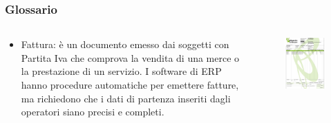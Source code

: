 \documentclass[]{beamer}
\begin{document}
\begin{frame}
\frametitle{Glossario}
\begin{columns}
  \begin{column}{.55\textwidth}
    \begin{itemize}
      \item \alert{Fattura:} è un documento emesso dai soggetti con Partita Iva che comprova la vendita di una merce o la prestazione di un servizio. I software di ERP hanno procedure automatiche per emettere fatture, ma richiedono che i dati di partenza inseriti dagli operatori siano precisi e completi.
    \end{itemize}
  \end{column}
  \begin{column}{.5\textwidth}
    \begin{figure}
      \includegraphics[width=\columnwidth]{img/fattura.png}
    \end{figure}
  \end{column}
\end{columns}
\end{frame}
\end{document}
